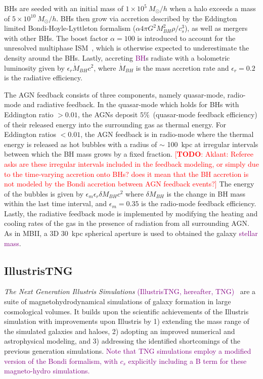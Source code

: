 \documentclass[twocolumn]{aastex631}
\newcommand{\todo}[1]{\textcolor{red}{[{\bf TODO}: #1]}}
\newcommand{\red}[1]{\textcolor{purple}{#1}}
\begin{document}
BHs are seeded with an initial mass of $1 \times 10^5~M_{\odot}/h$ when a halo exceeds a mass of $5 \times 10^{10}~M_{\odot}/h$. BHs then grow via accretion described by the Eddington limited Bondi-Hoyle-Lyttleton formalism ($\alpha4\pi G^2M_{BH}^2 \rho/c_s^3$), as well as mergers with other BHs. The boost factor $\alpha=100$ is introduced to account for the unresolved multiphase ISM~\citep{Springel2005, 2009MNRAS.398...53B}, which is otherwise expected to underestimate the density around the BHs. Lastly, accreting \red{BH}s radiate with a bolometric luminosity given by $\epsilon_r \dot{M}_{BH}c^2$, where $\dot{M}_{BH}$ is the mass accretion rate and $\epsilon_r=0.2$ is the radiative efficiency.

The AGN feedback consists of three components, namely quasar-mode, radio-mode and radiative feedback. In the quasar-mode which holds for BHs with Eddington ratio $>0.01$, the AGNs deposit $5\%$~(quasar-mode feedback efficiency) of their released energy into the surrounding gas as thermal energy. For Eddington ratios $<0.01$, the AGN feedback is in radio-mode where the thermal energy is released as hot bubbles with a radius of $\sim$ 100~kpc at irregular intervals between which the BH mass grows by a fixed fraction. \todo{Aklant: Referee asks are these irregular intervals included in the feedback modeling, or simply due to the time-varying accretion onto BHs? does it mean that the BH accretion is not modeled by the Bondi accretion between AGN feedback events?} The energy of the bubbles is given by $\epsilon_m \epsilon_r \delta M_{BH} c^2$ where $\delta M_{BH}$ is the change in BH mass within the last time interval, and $\epsilon_m=0.35$ is the radio-mode feedback efficiency. Lastly, the radiative feedback mode is implemented by modifying the heating and cooling rates of the gas in the presence of radiation from all surrounding AGN. As in MBII, a 3D 30~kpc spherical aperture is used to obtained the galaxy \red{stellar mass}. %


\subsection{IllustrisTNG}
{\it The Next Generation Illustris Simulations} \red{(IllustrisTNG, hereafter, TNG)~\citep{2018MNRAS.475..676S, Pillepich2018, Naiman2018, Marinacci2018, Nelson2018}} are a suite of magnetohydrodynamical simulations of galaxy formation in large cosmological volumes. It builds upon the scientific achievements of the Illustris simulation with improvements upon Illustris by 1) extending the mass range of the simulated galaxies and haloes, 2) adopting an improved numerical and astrophysical modeling, and 3) addressing the identified shortcomings of the previous generation simulations. \red{Note that TNG simulations employ a modified version of the Bondi formalism, with $c_s$ explicitly including a B term for these magneto-hydro simulations.}
\end{document}
